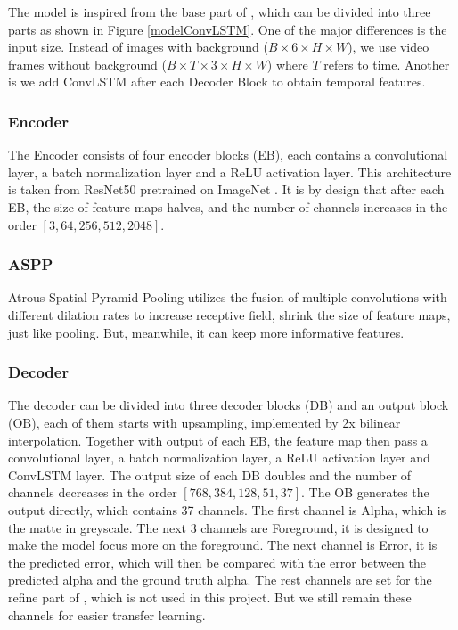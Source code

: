 \documentclass[final]{cvpr}
\begin{document}
The model is inspired from the base part of \cite{linRealTimeHighResolutionBackground2020a}, which can be divided into three parts as shown in Figure \ref{modelConvLSTM}.
One of the major differences is the input size.
Instead of images with background ($B\times 6\times H \times W$), we use video frames without background ($B\times T\times 3\times H \times W$) where $T$ refers to time.
Another is we add ConvLSTM after each Decoder Block to obtain temporal features.

\subsubsection{Encoder}

The Encoder consists of four encoder blocks (EB), each contains a convolutional layer, a batch normalization layer and a ReLU activation layer.
This architecture is taken from ResNet50 pretrained on ImageNet \cite{imagenet_cvpr09}.
It is by design that after each EB, the size of feature maps halves, and the number of channels increases in the order $[3, 64, 256, 512, 2048]$.

\subsubsection{ASPP}

Atrous Spatial Pyramid Pooling utilizes the fusion of multiple convolutions with different dilation rates to increase receptive field, shrink the size of feature maps, just like pooling.
But, meanwhile, it can keep more informative features.

\subsubsection{Decoder}

The decoder can be divided into three decoder blocks (DB) and an output block (OB), each of them starts with upsampling, implemented by 2x bilinear interpolation.
Together with output of each EB, the feature map then pass a convolutional layer, a batch normalization layer, a ReLU activation layer and ConvLSTM layer.
The output size of each DB doubles and the number of channels decreases in the order  $[768, 384, 128, 51, 37]$.
The OB generates the output directly, which contains 37 channels.
The first channel is Alpha, which is the matte in greyscale.
The next 3 channels are Foreground, it is designed to make the model focus more on the foreground.
The next channel is Error, it is the predicted error, which will then be compared with the error between the predicted alpha and the ground truth alpha.
The rest channels are set for the refine part of \cite{linRealTimeHighResolutionBackground2020a}, which is not used in this project.
But we still remain these channels for easier transfer learning.
\end{document}

